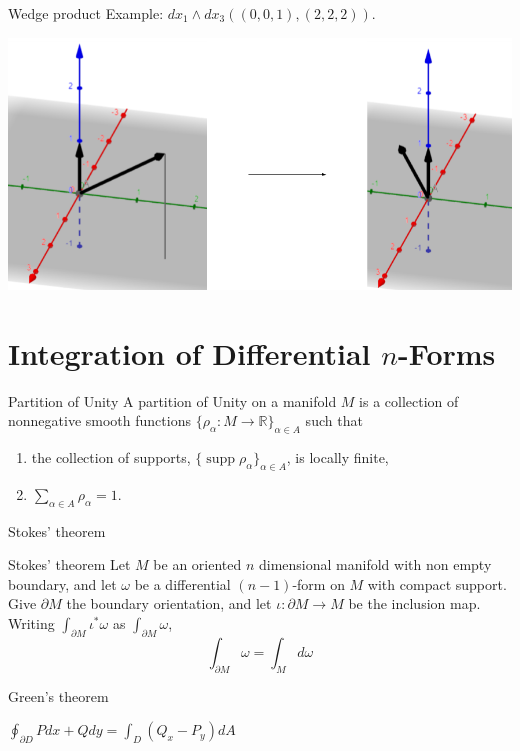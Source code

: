 \documentclass[9pt]{beamer}
\DeclareMathOperator{\supp}{supp}
\begin{document}
\begin{frame}{Wedge product}
    Example: $dx_1\wedge dx_3((0,0,1), (2,2,2))$.
    
    \includegraphics[scale=0.5]{Untitled drawing (1).png}
    
\end{frame}


\section{Integration of Differential \texorpdfstring{$n$}{n}-Forms}

\begin{frame}
    \begin{block}{Partition of Unity}
        A partition of Unity on a manifold $M$ is a collection of nonnegative smooth functions $\{\rho_\alpha:M \rightarrow \mathbb{R}\}_{\alpha\in A}$ such that \begin{enumerate}[i]
            \item the collection of supports, $\{\supp\rho_\alpha\}_{\alpha\in A}$, is locally finite,
            \item $\sum_{\alpha\in A} \rho_\alpha = 1.$
        \end{enumerate}
    \end{block}
\end{frame}

\begin{frame}{Stokes' theorem}
    \begin{block}{Stokes' theorem}
    Let $M$ be an oriented $n$ dimensional manifold with non empty boundary, and let $\omega$ be a differential $(n-1)$-form on $M$ with compact support. Give $\partial M$ the boundary orientation, and let $\iota:\partial M \rightarrow M$ be the inclusion map. Writing $\int_{\partial M}\iota^*\omega$ as $\int_{\partial M}\omega$, \[\int_{\partial M}\omega = \int_Md\omega\]
    \end{block}
\end{frame}

\begin{frame}{Green's theorem}
    \begin{center}
        $\oint_{\partial D}Pdx+Qdy=\int_D(Q_x-P_y)dA$
    \end{center}
\end{frame}
\end{document}
